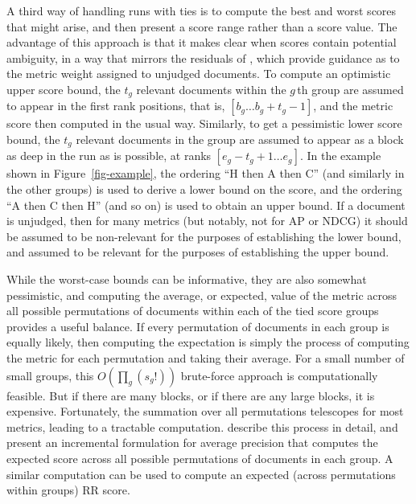 A third way of handling runs with ties is to compute the best and
worst scores that might arise, and then present a score range rather
than a score value.
The advantage of this approach is that it makes clear when scores
contain potential ambiguity, in a way that mirrors the residuals of
{\citet{mz08acmtois}}, which provide guidance as to the metric weight
assigned to unjudged documents.
To compute an optimistic upper score bound, the $t_g$ relevant
documents within the $g$\,th group are assumed to appear in the
first rank positions, that is, $[b_g\ldots b_g+t_g-1]$, and the
metric score then computed in the usual way.
Similarly, to get a pessimistic lower score bound, the $t_g$ relevant
documents in the group are assumed to appear as a block as deep in
the run as is possible, at ranks $[e_g-t_g+1\ldots e_g]$.
In the example shown in Figure~\ref{fig-example}, the ordering ``H
then A then C'' (and similarly in the other groups) is used to derive
a lower bound on the score, and the ordering ``A then C then H'' (and
so on) is used to obtain an upper bound.
If a document is unjudged, then for many metrics (but notably, not
for AP or NDCG) it should be assumed to be non-relevant for the
purposes of establishing the lower bound, and assumed to be relevant
for the purposes of establishing the upper bound.


While the worst-case bounds can be informative, they are also
somewhat pessimistic, and computing the average, or expected, value
of the metric across all possible permutations of documents within
each of the tied score groups provides a useful balance.
If every permutation of documents in each group is equally likely,
then computing the expectation is simply the process of computing the
metric for each permutation and taking their average.
For a small number of small groups, this $O(\prod_g (s_g!))$
brute-force approach is computationally feasible.
But if there are many blocks, or if there are any large blocks, it is
expensive.
Fortunately, the summation over all permutations telescopes for most
metrics, leading to a tractable computation.
{\citet{mn08ecir}} describe this process in detail, and present an
incremental formulation for average precision that computes the
expected score across all possible permutations of documents in each
group.
A similar computation can be used to compute an expected (across
permutations within groups) RR score.


